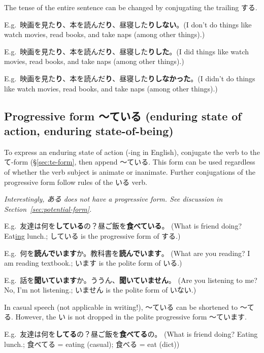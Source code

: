 \documentclass[../nihongo-gakushuu-kyouzai-grammar.tex]{subfiles}
\begin{document}
The tense of the entire sentence can be changed by conjugating the trailing する.

E.g.\ 映画を見た\textbf{り}、本を読んだ\textbf{り}、昼寝した\textbf{りしない}。(I don't do things like watch movies, read books, and take naps (among other things).)

E.g.\ 映画を見た\textbf{り}、本を読んだ\textbf{り}、昼寝した\textbf{りした}。(I did things like watch movies, read books, and take naps (among other things).)

E.g.\ 映画を見た\textbf{り}、本を読んだ\textbf{り}、昼寝した\textbf{りしなかった}。(I didn't do things like watch movies, read books, and take naps (among other things).)


\subsection{Progressive form 〜ている (enduring state of action, enduring state-of-being)} \label{sec:progressive-form}

To express an enduring state of action (-ing in English), conjugate the verb to the て-form (\S\ref{sec:te-form}, then append 〜ている. This form can be used regardless of whether the verb subject is animate or inanimate. Further conjugations of the progressive form follow rules of the いる verb.

\emph{Interestingly, ある does not have a progressive form. See discussion in Section~\ref{sec:potential-form}.}

E.g.\ 友達は何を\textbf{している}の？昼ご飯を\textbf{食べている}。 (What is friend doing? Eat\ul{ing} lunch.; している is the progressive form of する.)

E.g.\ 何を\textbf{読んでいます}か。教科書を\textbf{読んでいます}。 (What are you reading? I am reading textbook.; います is the polite form of いる.)

E.g.\ 話を\textbf{聞いています}か。ううん、\textbf{聞いていません}。 (Are you listening to me? No, I'm not listening.; いません is the polite form of いない.)

In casual speech (not applicable in writing!), 〜ている can be shortened to 〜てる. However, the い is not dropped in the polite progressive form 〜ています. 

E.g.\ 友達は何を\textbf{してる}の？昼ご飯を\textbf{食べてる}の。 (What is friend doing? Eating lunch.; 食べてる = eating (casual); 食べる = eat (dict))
\end{document}
